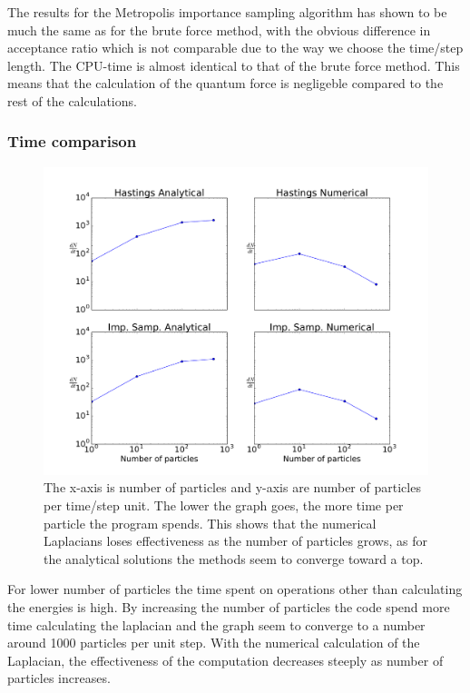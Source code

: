 \documentclass[12pt]{article}
\begin{document}
  
  The results for the Metropolis importance sampling algorithm has shown to be much the same as for
  the brute force method, with the obvious difference in acceptance ratio which is not comparable 
  due to the way we choose the time/step length. The CPU-time is almost identical to that of the
  brute force method. This means that the calculation of the quantum force is negligeble compared
  to the rest of the calculations.

  \newpage
  \subsubsection{Time comparison}
  \begin{figure}[h!]
    \centerline{
    \includegraphics[scale=0.49]{graphs/Npart_time.pdf}
  }
    \caption{The x-axis is number of particles and y-axis are number of particles per time/step %
	     unit. The lower the graph goes, the more time per particle the program spends. %
	     This shows that the numerical Laplacians loses effectiveness as the number of %
	     particles grows, as for the analytical solutions the methods seem to converge %
	     toward a top.%
	     }
    
  \end{figure}
  For lower number of particles the time spent on operations other than calculating the energies
  is high. By increasing the number of particles the code spend more time calculating the
  laplacian and the graph seem to converge to a number around 1000 particles per unit
  step. With the numerical calculation of the Laplacian, the effectiveness of the computation
  decreases steeply as number of particles increases.
  
\end{document}
